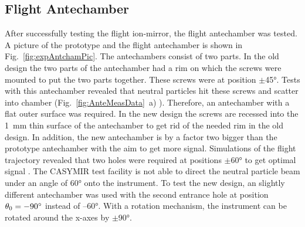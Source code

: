 	
	\subsection{Flight Antechamber} \label{subsec:ExpAnteCham}
	After successfully testing the flight ion-mirror, the flight antechamber was tested. A picture of the prototype and the flight antechamber is shown in Fig.~\ref{fig:expAntchamPic}. The antechambers consist of two parts. In the old design the two parts of the antechamber had a rim on which the screws were mounted to put the two parts together. These screws were at position $\pm$45°. Tests with this antechamber revealed that neutral particles hit these screws and scatter into chamber (Fig.~\ref{fig:AnteMeasData}~a) \cite{Meyer_2017_ante}). Therefore, an antechamber with a flat outer surface was required. In the new design the screws are recessed into the 1~mm thin surface of the antechamber to get rid of the needed rim in the old design. In addition, the new antechamber is by a factor two bigger than the prototype antechamber with the aim to get more signal. Simulations of the flight trajectory revealed that two holes were required at positions $\pm$60° to get optimal signal \cite{SOC_Crema3p2}. The CASYMIR test facility is not able to direct the neutral particle beam under an angle of 60° onto the instrument. To test the new design, an slightly different antechamber was used with the second entrance hole at position $\theta_0 = -90^\circ$ instead of --60°. With a rotation mechanism, the instrument can be rotated around the x-axes by $\pm$90°.\\
